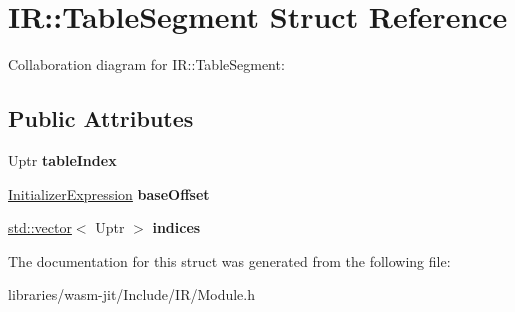 \hypertarget{struct_i_r_1_1_table_segment}{}\section{IR\+:\+:Table\+Segment Struct Reference}
\label{struct_i_r_1_1_table_segment}


Collaboration diagram for IR\+:\+:Table\+Segment\+:
\subsection*{Public Attributes}
\begin{DoxyCompactItemize}
\item 
\mbox{\label{struct_i_r_1_1_table_segment_a021e74480592e89038abc6d090742bc7}} 
Uptr {\bfseries table\+Index}
\item 
\mbox{\label{struct_i_r_1_1_table_segment_aa3665479e20f35435cf111f04a5f7a28}} 
\mbox{\hyperlink{struct_i_r_1_1_initializer_expression}{Initializer\+Expression}} {\bfseries base\+Offset}
\item 
\mbox{\label{struct_i_r_1_1_table_segment_a7ef544bc423b39282171f3af24ea8ff4}} 
\mbox{\hyperlink{classstd_1_1vector}{std\+::vector}}$<$ Uptr $>$ {\bfseries indices}
\end{DoxyCompactItemize}


The documentation for this struct was generated from the following file\+:\begin{DoxyCompactItemize}
\item 
libraries/wasm-\/jit/\+Include/\+I\+R/Module.\+h\end{DoxyCompactItemize}
